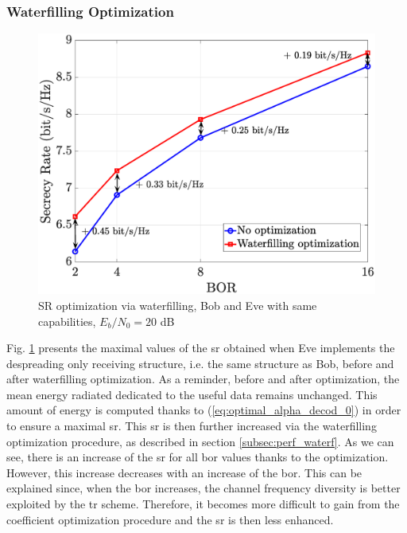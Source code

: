 \subsubsection{Waterfilling Optimization}
\label{subsub:simu_waterfilling}
\begin{figure}[htb!]
    \centering
    \centerline{\includegraphics[width = .65\textwidth]{graphs/alpha_waterfilling.eps}}
    \caption{SR optimization via waterfilling, Bob and Eve with same capabilities, $E_b/N_0=20$ dB}
    \label{fig:waterfilling_opt_alpha}
\end{figure} 
Fig. \ref{fig:waterfilling_opt_alpha} presents the maximal values of the \gls{sr} obtained when Eve implements the despreading only receiving structure, i.e. the same structure as Bob, before and after waterfilling optimization. As a reminder, before and after optimization, the mean energy radiated dedicated to the useful data remains unchanged. This amount of energy is computed thanks to (\ref{eq:optimal_alpha_decod_0}) in order to ensure a maximal \gls{sr}. This \gls{sr} is then further increased via the waterfilling optimization procedure, as described in section \ref{subsec:perf_waterf}. As we can see, there is an increase of the \gls{sr} for all \gls{bor} values thanks to the optimization. However, this increase decreases with an increase of the \gls{bor}. This can be explained since, when the \gls{bor} increases, the channel frequency diversity is better exploited by the \gls{tr} scheme. Therefore, it becomes more difficult to gain from the coefficient optimization procedure and the \gls{sr} is then less enhanced. 